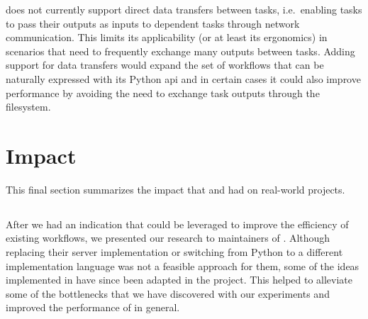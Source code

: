 \begin{description}[wide=0pt]
		\hyperqueue{} does not currently support direct data transfers
		between tasks, i.e.\ enabling tasks to pass their outputs as inputs to dependent tasks through
		network communication. This limits its applicability (or at least its ergonomics) in scenarios that
		need to frequently exchange many outputs between tasks. Adding support for data transfers
		would expand the set of workflows that can be naturally expressed with its Python
		\gls{api} and in certain cases it could also improve performance by avoiding the need to
		exchange task outputs through the filesystem.
\end{description}


\section{Impact}
This final section summarizes the impact that \rsds{} and
\hyperqueue{} had on real-world projects.

\vspace{-2mm}\subsection*{\rsds{}}
After we had an indication that \rsds{} could be leveraged to improve the
efficiency of existing \dask{} workflows, we presented our \rsds{} research to maintainers of \dask{}. Although replacing their server implementation or switching from Python
to a different implementation language was not a feasible approach for them, some of the ideas
implemented in \rsds{} have since been adapted in the \dask{}
project. This helped to alleviate some of the bottlenecks that we have discovered with our
experiments and improved the performance of \dask{} in
general.

